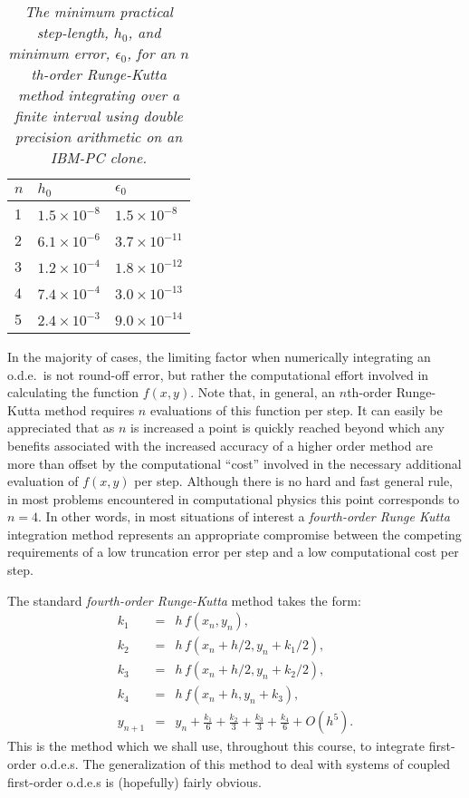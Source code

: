 \begin{table}\centering
\begin{tabular}{|l|l|l|}\hline
$n$ &$h_0$& $\epsilon_0$  \\[0.5ex]\hline
1 &$1.5\times 10^{-8}$& $1.5\times 10^{-8}$  \\[0.5ex]
2 &$6.1\times 10^{-6}$& $3.7\times 10^{-11}$ \\[0.5ex]
3 &$1.2\times 10^{-4}$& $1.8\times 10^{-12}$ \\[0.5ex]
4 &$7.4\times 10^{-4}$& $3.0\times 10^{-13}$ \\[0.5ex]
5 &$2.4\times 10^{-3}$& $9.0\times 10^{-14}$ \\\hline
\end{tabular}
\caption{\em The minimum practical step-length, $h_0$, and minimum error, $\epsilon_0$, for an
$n$th-order Runge-Kutta method integrating over a finite interval
 using double precision arithmetic on an
IBM-PC clone.}\label{t1}
\end{table}

In the majority of cases, the limiting factor when numerically integrating an
o.d.e.\ is not round-off error, but rather the computational effort involved
in calculating the function $f(x,y)$. Note that, in general, an $n$th-order
Runge-Kutta method requires $n$ evaluations of this function per step. It can
easily be appreciated that as $n$ is increased a point is quickly reached beyond which
any benefits associated with the increased accuracy of a higher order
method are more than offset by the computational ``cost'' involved in the
necessary additional  evaluation of
$f(x,y)$ per step. Although there is no hard and fast general rule, in most
problems encountered in computational physics this point corresponds to $n=4$. In other words,
in most situations of interest a {\em fourth-order Runge Kutta}\/ 
integration method represents an appropriate compromise between
the competing requirements of a low truncation error per step and a low computational
cost per step.


The standard {\em fourth-order Runge-Kutta} method takes the form:
\begin{eqnarray}
k_1 &=& h\,f(x_n,y_n),\label{e1.38}\\[0.5ex]
k_2 &=& h\,f(x_n+h/2, y_n+k_1/2),\\[0.5ex]
k_3 &=& h\,f(x_n+h/2, y_n+k_2/2),\\[0.5ex]
k_4 &=& h\,f(x_n+h, y_n+k_3),\\[0.5ex]
y_{n+1} &=& y_n + \frac{k_1}{6}+\frac{k_2}{3} +\frac{k_3}{3}+\frac{k_4}{6}
+O(h^5).\label{e1.42}
\end{eqnarray}
This is the method which we shall use, throughout this course, to integrate 
first-order o.d.e.s.
The generalization of this method to deal with systems of coupled first-order
 o.d.e.s is (hopefully) fairly obvious.

